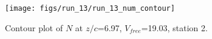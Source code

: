 \begin{figure}[H]
\centering
\texttt{[image: figs/run\_13/run\_13\_num\_contour]}
\caption{Contour plot of $N$ at $z/c$=6.97, $V_{free}$=19.03, station 2.}
\label{fig:run_13_num_contour}
\end{figure}


